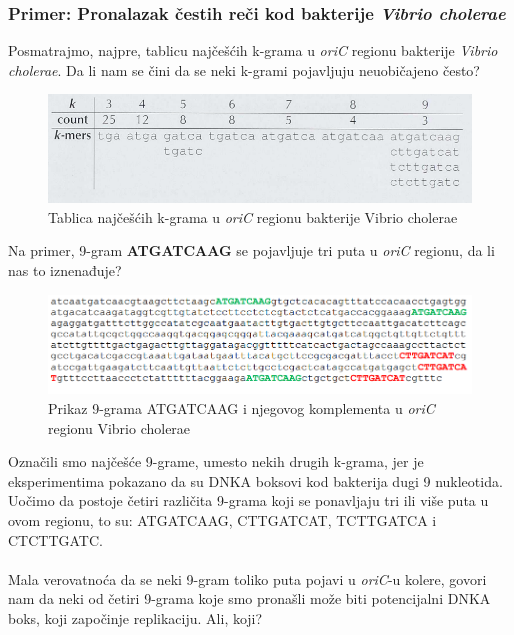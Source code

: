 \subsubsection{Primer: Pronalazak čestih reči kod bakterije \textit{Vibrio cholerae}} 

Posmatrajmo, najpre, tablicu najčešćih k-grama u \textit{oriC} regionu bakterije \textit{Vibrio cholerae}. Da li nam se čini da se neki k-grami pojavljuju neuobičajeno često?\\ 

\begin{figure}[h]
\centering
\includegraphics[width=1\textwidth]{poglavlja/1/slike/Tablica_VC.png}
\caption{Tablica najčešćih k-grama u \textit{oriC} regionu bakterije Vibrio cholerae}
\end{figure} 

Na primer, 9-gram \textbf{ATGATCAAG} se pojavljuje tri puta u \textit{oriC} regionu, da li nas to iznenađuje?\\

\begin{figure}[h]
\centering
\includegraphics[width=1\textwidth]{poglavlja/1/slike/9_VC.png}
\caption{Prikaz 9-grama ATGATCAAG i njegovog komplementa u \textit{oriC} regionu Vibrio cholerae}
\end{figure} 

Označili smo najčešće 9-grame, umesto nekih drugih k-grama, jer je eksperimentima pokazano da su DNKA boksovi kod bakterija dugi 9 nukleotida. Uočimo da postoje četiri različita 9-grama koji se ponavljaju tri ili više puta u ovom regionu, to su: ATGATCAAG, CTTGATCAT, TCTTGATCA i CTCTTGATC.\\\\

Mala verovatnoća da se neki 9-gram toliko puta pojavi u \textit{oriC}-u kolere, govori nam da neki od četiri 9-grama koje smo pronašli može biti potencijalni DNKA boks, koji započinje replikaciju. Ali, koji?

